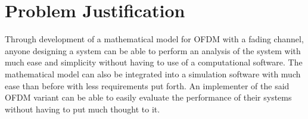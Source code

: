 
\section{Problem Justification}
Through  development of a mathematical model for \gls{OFDM}  with a fading channel, anyone designing a system can be able to perform an analysis of the system with much ease and simplicity without having to use of a computational software. The mathematical model can also be integrated into a simulation software with much ease than before with less requirements put forth. An implementer of the said \gls{OFDM} variant can be able to easily evaluate the performance of their systems without having to put much thought to it.